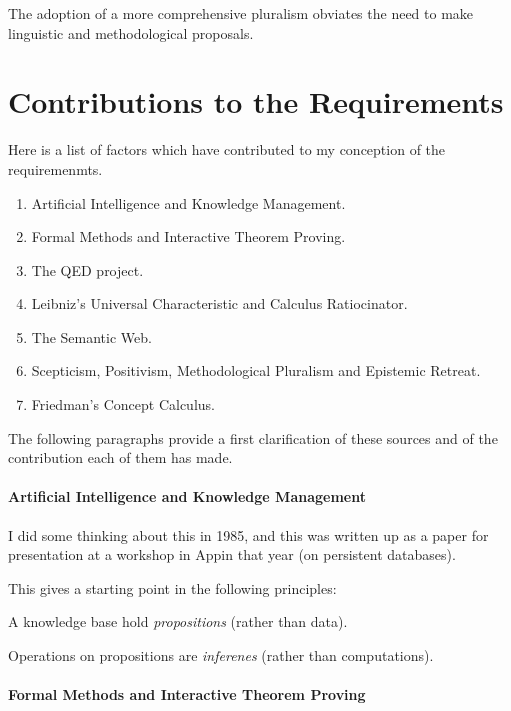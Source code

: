 The adoption of a more comprehensive pluralism obviates the need to make linguistic and methodological proposals.


\section{Contributions to the Requirements}

Here is a list of factors which have contributed to my conception of the requiremenmts.

\begin{enumerate}
\item Artificial Intelligence and Knowledge Management.
\item Formal Methods and Interactive Theorem Proving.
\item The QED project.
\item Leibniz's Universal Characteristic and Calculus Ratiocinator.
\item The Semantic Web.
\item Scepticism, Positivism, Methodological Pluralism and Epistemic Retreat.
\item Friedman's Concept Calculus.
\end{enumerate}

The following paragraphs provide a first clarification of these sources and of the contribution each of them has made.

\paragraph{Artificial Intelligence and Knowledge Management}

I did some thinking about this in 1985, and this was written up as a paper for presentation at a workshop in Appin that year (on persistent databases)\cite{Jones85}.

This gives a starting point in the following principles:

\begin{iprin}
A knowledge base hold \emph{propositions} (rather than data).
\end{iprin}

\begin{iprin}
Operations on propositions are \emph{inferenes} (rather than computations).
\end{iprin}

\paragraph{Formal Methods and Interactive Theorem Proving}


